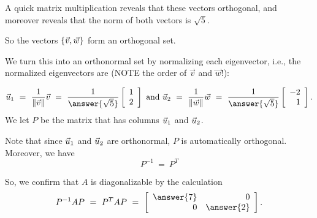 \documentclass{ximera}
\begin{document}
\begin{example}
  A quick matrix multiplication reveals that these vectors  orthogonal, and moreover reveals that the norm of both vectors is $\sqrt{5}$.
  
  So
  the vectors $\left\{\vec{v},\vec{w}\right\}$ form an orthogonal set. 
  
  We
  turn this into an orthonormal set by normalizing each eigenvector,
  i.e., the normalized eigenvectors are (NOTE the order of $\vec{v}$ and $\vec{w}$!):

  \begin{equation*}
    \vect{u}_1
    ~=~ \frac{1}{\norm{\vect{v}}}\vect{v}
    ~=~ \frac{1}{\answer{\sqrt{5}}} \startmat{r} 1 \\ 2 \stopmat
    \quad\mbox{and}\quad
    \vect{u}_2
    ~=~ \frac{1}{\norm{\vect{w}}}\vect{w}
    ~=~ \frac{1}{\answer{\sqrt{5}}} \startmat{r} -2 \\ 1 \stopmat.
  \end{equation*}
  We let $P$ be the matrix that has columns $\vec{u}_1$ and
  $\vec{u}_2$.
  
  Note that since $\vec{u}_1$ and $\vec{u}_2$ are orthonormal, $P$
  is automatically orthogonal. Moreover, we
  have
  \begin{equation*}
    P^{-1}
    ~=~ P^T
  \end{equation*}

  So, we confirm that $A$ is diagonalizable by the calculation
  \begin{equation*}
    P^{-1}AP
    ~=~ P^TAP
    ~=~ \startmat{rr} \answer{7} & 0 \\ 0 & \answer{2} \stopmat.
  \end{equation*}
\end{example}
\end{document}
